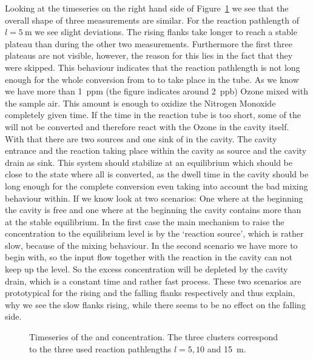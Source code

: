 Looking at the  timeseries on the right hand side of
Figure~\ref{fig:ts} we see that the overall shape of three
measurements are similar. For the reaction pathlength of $l=
\SI{5}{\meter}$ we see slight deviations. The rising flanks take
longer to reach a stable plateau than during the other two
measurements. Furthermore the first three plateaus are not visible,
however, the reason for this lies in the fact that they were
skipped. This behaviour indicates that the reaction
pathlength is not long enough for the whole conversion from  to
 to take place in the tube. As we know we have more than
\SI{1}{ppm} (the figure indicates around \SI{2}{ppb}) Ozone mixed with
the sample air. This amount is enough to oxidize the Nitrogen Monoxide
completely given time. If the time in the reaction tube is too short,
some of the  will not be converted and therefore react with the
Ozone in the cavity itself. With that there are two sources and one
sink of  in the cavity. The cavity entrance and the reaction
taking place within the cavity as source and the cavity drain as
sink. This system should stabilize at an equilibrium which should be
close to the state where all  is converted, as the dwell time
in the cavity should be long enough for the complete conversion even
taking into account the bad mixing behaviour within. If we know look
at two scenarios: One where at the beginning the cavity is 
free and one where at the beginning the cavity contains more 
than at the stable equilibrium. In the first case the main mechanism
to raise the  concentration to the equilibrium level is by the
`reaction source', which is rather slow, because of the mixing
behaviour. In the second scenario we have more  to begin with,
so the input flow together with the reaction in the cavity can not
keep up the level. So the excess concentration will be depleted by the
cavity drain, which is a constant time and rather fast process. These
two scenarios are prototypical for the rising and the falling flanks
respectively and thus explain, why we see the slow flanks rising,
while there seems to be no effect on the falling side.

\begin{figure}[htbp]
  \centering
  
  \hfill
  
  \caption{Timeseries of the  and  concentration. The
    three clusters correspond to the three used reaction pathlengths
    $l = 5, 10$ and \SI{15}{\meter}.}
  \label{fig:ts}
\end{figure}

